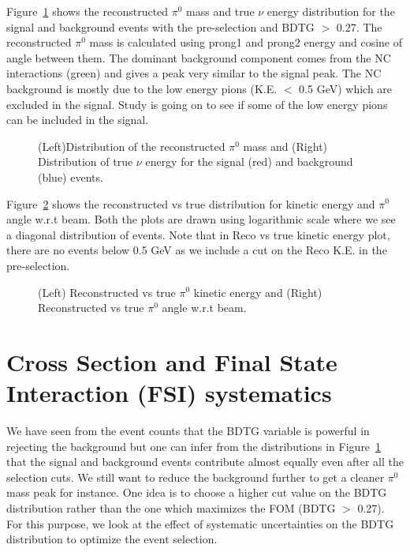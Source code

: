 \documentclass[12pt]{article}
\begin{document}
Figure~\ref{fig:massandenergy} shows the reconstructed $\pi^{0}$ mass and true $\nu$ energy distribution for the signal and background events with the pre-selection and BDTG $>$ 0.27. The reconstructed $\pi^{0}$ mass is calculated using prong1 and prong2 energy and cosine of angle between them. The dominant background component comes from the NC interactions (green) and gives a peak very similar to the signal peak. The NC background is mostly due to the low energy pions (K.E. $<$ 0.5 GeV) which are excluded in the signal. Study is going on to see if  some of the low energy pions can be included in the signal. 

\begin{figure}[htb]
\begin{center}
\caption{(Left)Distribution of the reconstructed $\pi^{0}$ mass and (Right) Distribution of true $\nu$ energy for the signal (red) and background (blue) events.}
\label{fig:massandenergy}
\end{center}
\end{figure}

Figure~\ref{fig:recovstrue} shows the reconstructed vs true distribution for kinetic energy and $\pi^{0}$ angle w.r.t beam. Both the plots are drawn using logarithmic scale where we see a diagonal distribution of events. Note that in Reco vs true kinetic energy plot, there are no events below 0.5 GeV as we include a cut on the Reco K.E.  in the pre-selection.

 \begin{figure}[htb]
\begin{center}
\caption{(Left) Reconstructed vs true $\pi^{0}$ kinetic energy and (Right) Reconstructed vs true $\pi^{0}$ angle w.r.t beam.}
\label{fig:recovstrue}
\end{center}
\end{figure} 


\section{Cross Section and Final State Interaction (FSI) systematics}

We have seen from the event counts that the BDTG variable is powerful in rejecting the background but one can infer from the distributions in Figure~\ref{fig:massandenergy} that the signal and background events contribute almost equally even after all the selection cuts. We still want to reduce the background further to get a cleaner $\pi^{0}$ mass peak for instance. One idea is to choose a higher cut value on the BDTG distribution rather than the one which maximizes the FOM (BDTG $>$ 0.27). For this purpose, we look at the effect of systematic uncertainties on the BDTG distribution to optimize the event selection.
\end{document}
